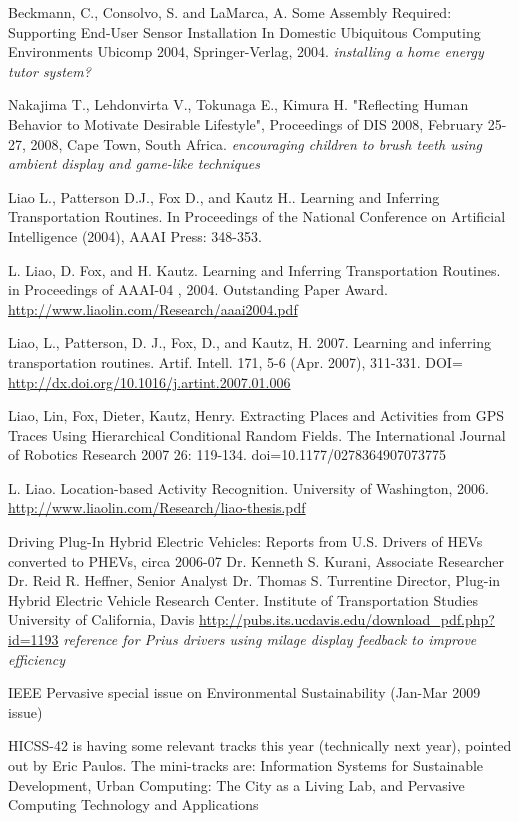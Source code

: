 Beckmann, C., Consolvo, S. and LaMarca, A. Some Assembly Required: Supporting End-User Sensor Installation In Domestic Ubiquitous Computing Environments Ubicomp 2004, Springer-Verlag, 2004. \emph{installing a home energy tutor system?}

Nakajima T., Lehdonvirta V., Tokunaga E., Kimura H. "Reflecting Human Behavior to Motivate Desirable Lifestyle", Proceedings of DIS 2008, February 25-27, 2008, Cape Town, South Africa. \emph{encouraging children to brush teeth using ambient display and game-like techniques}

Liao L., Patterson D.J., Fox D., and Kautz H.. Learning and Inferring Transportation Routines. In Proceedings of the National Conference on Artificial Intelligence (2004), AAAI Press: 348-353.

L. Liao, D. Fox, and H. Kautz. Learning and Inferring Transportation Routines. in Proceedings of AAAI-04 , 2004. Outstanding Paper Award. \url{http://www.liaolin.com/Research/aaai2004.pdf}

Liao, L., Patterson, D. J., Fox, D., and Kautz, H. 2007. Learning and inferring transportation routines. Artif. Intell. 171, 5-6 (Apr. 2007), 311-331. DOI= \url{http://dx.doi.org/10.1016/j.artint.2007.01.006}

Liao, Lin, Fox, Dieter, Kautz, Henry. Extracting Places and Activities from GPS Traces Using Hierarchical Conditional Random Fields. The International Journal of Robotics Research 2007 26: 119-134. doi=10.1177/0278364907073775

L. Liao. Location-based Activity Recognition. University of Washington, 2006. \url{http://www.liaolin.com/Research/liao-thesis.pdf}

Driving Plug-In Hybrid Electric Vehicles: Reports from U.S. Drivers of HEVs  
converted to PHEVs, circa 2006-07 Dr. Kenneth S. Kurani, Associate Researcher 
Dr. Reid R. Heffner, Senior Analyst Dr. Thomas S. Turrentine Director, Plug-in Hybrid Electric Vehicle Research Center. Institute of Transportation Studies 
University of California, Davis \url{http://pubs.its.ucdavis.edu/download_pdf.php?id=1193} \emph{reference for Prius drivers using milage display feedback to improve efficiency}

IEEE Pervasive special issue on Environmental Sustainability (Jan-Mar 2009 issue)

HICSS-42 is having some relevant tracks this year (technically next year), pointed out by Eric Paulos. The mini-tracks are: Information Systems for Sustainable Development, Urban Computing: The City as a Living Lab, and Pervasive Computing Technology and Applications

